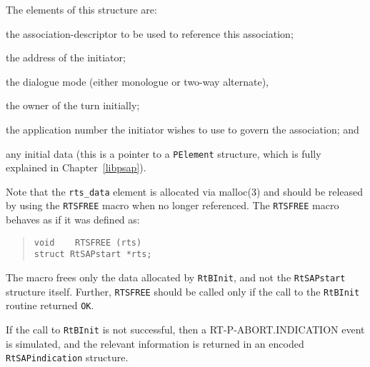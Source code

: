 The elements of this structure are:
\begin{describe}
\item[\verb"rts\_sd":] the association-descriptor to be used to
reference this association;

\item[\verb"rts\_initiator":] the address of the initiator;

\item[\verb"rts\_mode":] the dialogue mode (either monologue or two-way
alternate),

\item[\verb"rts\_turn":] the owner of the turn initially;

\item[\verb"rts\_port":] the application number the initiator wishes to use
to govern the association;
and

\item[\verb"rts\_data":] any initial data (this is a pointer to a
\verb"PElement" structure, which is fully explained in Chapter~\ref{libpsap}).
\end{describe}
Note that the \verb"rts_data" element is allocated via \man malloc(3) and
should be released by using the \verb"RTSFREE" macro when no longer referenced.
The \verb"RTSFREE" macro behaves as if it was defined as:
\begin{quote}\small\begin{verbatim}
void    RTSFREE (rts)
struct RtSAPstart *rts;
\end{verbatim}\end{quote}
The macro frees only the data allocated by \verb"RtBInit",
and not the \verb"RtSAPstart" structure itself.
Further,
\verb"RTSFREE" should be called only if the call to the \verb"RtBInit"
routine returned \verb"OK".

If the call to \verb"RtBInit" is not successful,
then a {\sf RT-P-ABORT.INDICATION\/} event is simulated,
and the relevant information is returned in an encoded
\verb"RtSAPindication" structure.

